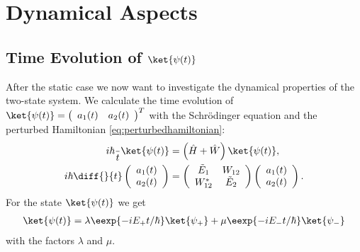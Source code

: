 \section{Dynamical Aspects}
\subsection{Time Evolution of $\ket{\psi(t)}$}
				After the static case we now want to investigate the dynamical properties of the two-state system. We calculate the time evolution of $\ket{\psi(t)} = \left(\begin{array}{cc} a_1(t) & a_2(t)\end{array}\right)^T$ with the Schrödinger equation and the perturbed Hamiltonian \eqref{eq:perturbedhamiltonian}:
				\begin{align}
					i\hbar \frac{}{t}\ket{\psi(t)}&=\left(\hat{H}+\hat{W}\right)\ket{\psi(t)},\\
					i\hbar \diff{}{t}\left(\begin{array}{c} a_1(t) \\ a_2(t) \end{array}\right) &= \left( \begin{array}{cc} \tilde{E}_1 & W_{12} \\ W_{12}^* & \tilde{E}_2 \end{array} \right) \left(\begin{array}{c} a_1(t) \\ a_2(t) \end{array} \right).
				\end{align}
				For the state $\ket{\psi(t)}$ we get
				\begin{align}
					\ket{\psi(t)}=\lambda \eexp{-i{E_+}t/{\hbar}} \ket{\psi_+} + \mu \eexp{-i{E_-}t/{\hbar}} \ket{\psi_-} \label{eq:psitimeevolution}
				\end{align}
				with the factors $\lambda$ and $\mu$.


